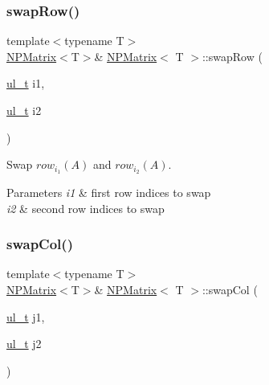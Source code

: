\subsubsection{\texorpdfstring{swapRow()}{swapRow()}}
{\footnotesize\ttfamily template$<$typename T$>$ \\
\mbox{\hyperlink{class_n_p_matrix}{N\+P\+Matrix}}$<$T$>$\& \mbox{\hyperlink{class_n_p_matrix}{N\+P\+Matrix}}$<$ T $>$\+::swap\+Row (\begin{DoxyParamCaption}\item[{\mbox{\hyperlink{typedef_8h_a1b140a2034db3f5dfe18a987745df43a}{ul\+\_\+t}}}]{i1,  }\item[{\mbox{\hyperlink{typedef_8h_a1b140a2034db3f5dfe18a987745df43a}{ul\+\_\+t}}}]{i2 }\end{DoxyParamCaption})\hspace{0.3cm}{\ttfamily [inline]}}



Swap $ row_{i_1}(A) $ and $ row_{i_2}(A) $. 


\begin{DoxyParams}{Parameters}
{\em i1} & first row indices to swap \\
\hline
{\em i2} & second row indices to swap \\
\hline
\end{DoxyParams}
\mbox{\label{class_n_p_matrix_a0df10f5717511bc15429955244b83ea1}} 
\subsubsection{\texorpdfstring{swapCol()}{swapCol()}}
{\footnotesize\ttfamily template$<$typename T$>$ \\
\mbox{\hyperlink{class_n_p_matrix}{N\+P\+Matrix}}$<$T$>$\& \mbox{\hyperlink{class_n_p_matrix}{N\+P\+Matrix}}$<$ T $>$\+::swap\+Col (\begin{DoxyParamCaption}\item[{\mbox{\hyperlink{typedef_8h_a1b140a2034db3f5dfe18a987745df43a}{ul\+\_\+t}}}]{j1,  }\item[{\mbox{\hyperlink{typedef_8h_a1b140a2034db3f5dfe18a987745df43a}{ul\+\_\+t}}}]{j2 }\end{DoxyParamCaption})\hspace{0.3cm}{\ttfamily [inline]}}



